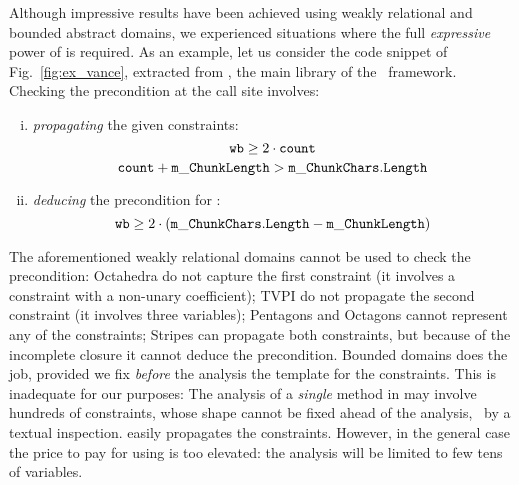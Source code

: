 \documentclass[sttt]{svjour}
\begin{document}
Although impressive results have been achieved using weakly relational and bounded abstract domains, we experienced situations where the full  \emph{expressive} power of \Poly{} is required.
As an example, let us consider the code snippet of Fig.~\ref{fig:ex_vance}, extracted from , the main library of the \NET\ framework.
Checking the precondition at the call site \code{(*)}  involves:
\begin{enumerate}[(i)]
 \item \emph{propagating} the given constraints:
 \[\mathtt{wb} \geq 2 \cdot \mathtt{count}\]
 \[\mathtt{count}  +  \mathtt{m\_ChunkLength > m\_ChunkChars.Length}\]
 \item \emph{deducing} the precondition for :
 \[\mathtt{wb} \geq  2 \cdot ( \mathtt{m\_ChunkChars.\allowbreak Length}-\mathtt{m\_ChunkLength})\] 
\end{enumerate}
The aforementioned weakly relational domains cannot be used to check the precondition: Octahedra do not capture the first constraint (it involves a constraint with a non-unary coefficient); TVPI do not propagate the second constraint (it involves three variables); Pentagons and Octagons cannot represent any of the constraints; Stripes can propagate both constraints, but because of the incomplete closure it cannot deduce the precondition.
Bounded domains does the job, provided we fix \emph{before} the analysis the  template for the constraints.
This is inadequate for our purposes: The analysis of a \emph{single} method in  may involve hundreds of constraints, whose shape cannot be fixed ahead of the analysis, \eg\ by a textual inspection.
\Polyhedra{} easily propagates the constraints. 
However, in the general case the price to pay for using \Polyhedra{}  is too elevated: the analysis will be limited to few tens of variables.
\end{document}
